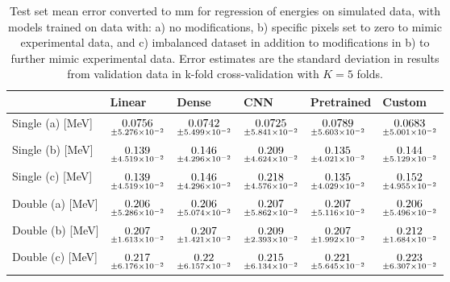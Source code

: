 \begin{table}
\centering
\caption{
Test set mean error converted to mm for regression of energies on simulated data, with models trained on data with: 
a) no modifications, b) specific pixels set to zero to mimic experimental data, and c) imbalanced dataset
in addition to modifications in b) to further mimic experimental data. Error estimates are the standard deviation 
in results from validation data in k-fold cross-validation with $K=5$ folds.
}
\label{tab:regression-simulated-all-energies-mse}
\begin{tabular}{llllll}
\toprule
{} &                                               Linear &                                                Dense &                                                  CNN &                                           Pretrained &                                               Custom \\
\midrule
Single (a) [MeV] &  $\underset{\num{+- 5.276e-02 }  }{\num{ 0.0756 } }$ &  $\underset{\num{+- 5.499e-02 }  }{\num{ 0.0742 } }$ &  $\underset{\num{+- 5.841e-02 }  }{\num{ 0.0725 } }$ &  $\underset{\num{+- 5.603e-02 }  }{\num{ 0.0789 } }$ &  $\underset{\num{+- 5.001e-02 }  }{\num{ 0.0683 } }$ \\
Single (b) [MeV] &  $\underset{\num{+- 4.519e-02 }  }{\num{ 0.139 } }$ &  $\underset{\num{+- 4.296e-02 }  }{\num{ 0.146 } }$ &  $\underset{\num{+- 4.624e-02 }  }{\num{ 0.209 } }$ &  $\underset{\num{+- 4.021e-02 }  }{\num{ 0.135 } }$ &  $\underset{\num{+- 5.129e-02 }  }{\num{ 0.144 } }$ \\
Single (c) [MeV] &  $\underset{\num{+- 4.519e-02 }  }{\num{ 0.139 } }$ &  $\underset{\num{+- 4.296e-02 }  }{\num{ 0.146 } }$ &  $\underset{\num{+- 4.576e-02 }  }{\num{ 0.218 } }$ &  $\underset{\num{+- 4.029e-02 }  }{\num{ 0.135 } }$ &  $\underset{\num{+- 4.955e-02 }  }{\num{ 0.152 } }$ \\
Double (a) [MeV] &  $\underset{\num{+- 5.286e-02 }  }{\num{ 0.206 } }$ &  $\underset{\num{+- 5.074e-02 }  }{\num{ 0.206 } }$ &  $\underset{\num{+- 5.862e-02 }  }{\num{ 0.207 } }$ &  $\underset{\num{+- 5.116e-02 }  }{\num{ 0.207 } }$ &  $\underset{\num{+- 5.496e-02 }  }{\num{ 0.206 } }$ \\
Double (b) [MeV] &  $\underset{\num{+- 1.613e-02 }  }{\num{ 0.207 } }$ &  $\underset{\num{+- 1.421e-02 }  }{\num{ 0.207 } }$ &  $\underset{\num{+- 2.393e-02 }  }{\num{ 0.209 } }$ &  $\underset{\num{+- 1.992e-02 }  }{\num{ 0.207 } }$ &  $\underset{\num{+- 1.684e-02 }  }{\num{ 0.212 } }$ \\
Double (c) [MeV] &  $\underset{\num{+- 6.176e-02 }  }{\num{ 0.217 } }$ &  $\underset{\num{+- 6.157e-02 }  }{\num{ 0.22 } }$ &  $\underset{\num{+- 6.134e-02 }  }{\num{ 0.215 } }$ &  $\underset{\num{+- 5.645e-02 }  }{\num{ 0.221 } }$ &  $\underset{\num{+- 6.307e-02 }  }{\num{ 0.223 } }$ \\
\bottomrule
\end{tabular}
\end{table}
